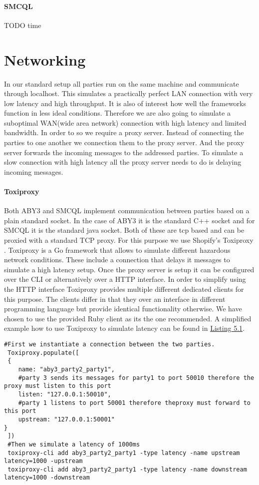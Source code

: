 \paragraph{SMCQL}
TODO time \cite{time_sh}
 
\section{Networking}
In our standard setup all parties run on the same machine and communicate through localhost. This simulates a practically perfect LAN connection with very low latency and high throughput. It is also of interest how well the frameworks function in less ideal conditions. Therefore we are also going to simulate a suboptimal WAN(wide area network) connection with high latency and limited bandwidth. In order to so we require a proxy server. Instead of connecting the parties to one another we connection them to the proxy server. And the proxy server forwards the incoming messages to the addressed parties. To simulate a slow connection with high latency all the proxy server needs to do is delaying incoming messages.    

 \paragraph{Toxiproxy}
 Both ABY3 and SMCQL implement communication between parties based on a plain standard socket. In the case of ABY3 it is the standard C++ socket and for SMCQL it is the standard java socket. Both of these are tcp based and can be proxied with a standard TCP proxy. For this purpose we use Shopify's Toxiproxy \cite{toxiproxy}. Toxiproxy is a Go framework that allows to simulate different hazardous network conditions. These include a connection that delays it messages to simulate a high latency setup. Once the proxy server is setup it can be configured over the CLI or alternatively over a HTTP interface. In order to simplify using the HTTP interface Toxiproxy provides multiple different dedicated clients for this purpose. The clients differ in that they over an interface in different programming language but provide identical functionality otherwise. We have chosen to use the provided Ruby client as its the one recommended. A simplified example how to use Toxiproxy to simulate latency can be found in \hyperref[the_label]{Listing 5.1}. 
 
 \label{Toxi_label}				
 \begin{lstlisting}[caption={Setting up a proxy that simulates latency between two parties with Toxiporxy}]
 #First we instantiate a connection between the two parties. 
 Toxiproxy.populate([
 {
 	name: "aby3_party2_party1",
 	#party 3 sends its messages for party1 to port 50010 therefore the proxy must listen to this port
 	listen: "127.0.0.1:50010",   
 	#party 1 listens to port 50001 therefore theproxy must forward to this port
 	upstream: "127.0.0.1:50001"  
}
 ])
 #Then we simulate a latency of 1000ms 
 toxiproxy-cli add aby3_party2_party1 -type latency -name upstream latency=1000 -upstream
 toxiproxy-cli add aby3_party2_party1 -type latency -name downstream latency=1000 -downstream
 
 \end{lstlisting}
